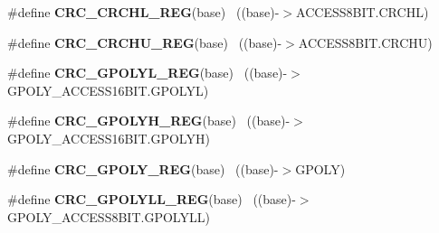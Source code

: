 \begin{DoxyCompactItemize}
\item 
\hypertarget{group___c_r_c___register___accessor___macros_ga89be07710e8d08250ca3b8dcbf6dd7ad}{}\#define {\bfseries C\+R\+C\+\_\+\+C\+R\+C\+H\+L\+\_\+\+R\+E\+G}(base)                                        ~((base)-\/$>$A\+C\+C\+E\+S\+S8\+B\+I\+T.\+C\+R\+C\+H\+L)\label{group___c_r_c___register___accessor___macros_ga89be07710e8d08250ca3b8dcbf6dd7ad}

\item 
\hypertarget{group___c_r_c___register___accessor___macros_ga4cf80e6cff3baf934f320fa9d78e3723}{}\#define {\bfseries C\+R\+C\+\_\+\+C\+R\+C\+H\+U\+\_\+\+R\+E\+G}(base)                                        ~((base)-\/$>$A\+C\+C\+E\+S\+S8\+B\+I\+T.\+C\+R\+C\+H\+U)\label{group___c_r_c___register___accessor___macros_ga4cf80e6cff3baf934f320fa9d78e3723}

\item 
\hypertarget{group___c_r_c___register___accessor___macros_gab1698faf3a8970f99f403444ebb4d2c8}{}\#define {\bfseries C\+R\+C\+\_\+\+G\+P\+O\+L\+Y\+L\+\_\+\+R\+E\+G}(base)                                      ~((base)-\/$>$G\+P\+O\+L\+Y\+\_\+\+A\+C\+C\+E\+S\+S16\+B\+I\+T.\+G\+P\+O\+L\+Y\+L)\label{group___c_r_c___register___accessor___macros_gab1698faf3a8970f99f403444ebb4d2c8}

\item 
\hypertarget{group___c_r_c___register___accessor___macros_gafad4f84e32d790a7fe24cd92b2c480dd}{}\#define {\bfseries C\+R\+C\+\_\+\+G\+P\+O\+L\+Y\+H\+\_\+\+R\+E\+G}(base)                                      ~((base)-\/$>$G\+P\+O\+L\+Y\+\_\+\+A\+C\+C\+E\+S\+S16\+B\+I\+T.\+G\+P\+O\+L\+Y\+H)\label{group___c_r_c___register___accessor___macros_gafad4f84e32d790a7fe24cd92b2c480dd}

\item 
\hypertarget{group___c_r_c___register___accessor___macros_ga4380a8ebc7eff991b5db31a826e12c34}{}\#define {\bfseries C\+R\+C\+\_\+\+G\+P\+O\+L\+Y\+\_\+\+R\+E\+G}(base)                                        ~((base)-\/$>$G\+P\+O\+L\+Y)\label{group___c_r_c___register___accessor___macros_ga4380a8ebc7eff991b5db31a826e12c34}

\item 
\hypertarget{group___c_r_c___register___accessor___macros_gaf49775745cf42c0370512f2c0058acd7}{}\#define {\bfseries C\+R\+C\+\_\+\+G\+P\+O\+L\+Y\+L\+L\+\_\+\+R\+E\+G}(base)                                    ~((base)-\/$>$G\+P\+O\+L\+Y\+\_\+\+A\+C\+C\+E\+S\+S8\+B\+I\+T.\+G\+P\+O\+L\+Y\+L\+L)\label{group___c_r_c___register___accessor___macros_gaf49775745cf42c0370512f2c0058acd7}


\end{DoxyCompactItemize}
